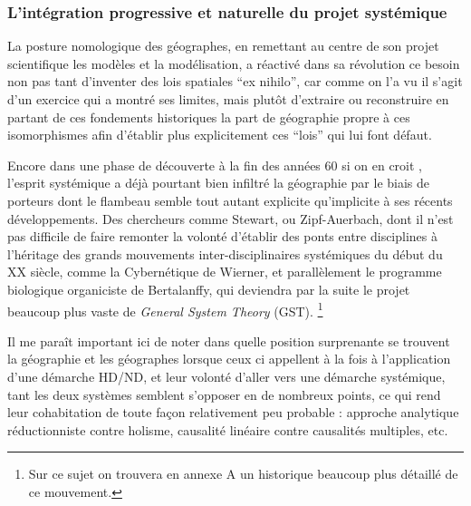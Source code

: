 
\subsubsection{L'intégration progressive et naturelle du projet systémique}
\label{sssec:progressive_systemique}

La posture nomologique des géographes, en remettant au centre de son projet scientifique les modèles et la modélisation, a réactivé dans sa révolution ce besoin non pas tant d'inventer des lois spatiales \foreignquote{latin}{ex nihilo}, car comme on l'a vu il s'agit d'un exercice qui a montré ses limites, mais plutôt d'extraire ou reconstruire en partant de ces fondements historiques la part de géographie propre à ces isomorphismes afin d'établir plus explicitement ces \enquote{lois} qui lui font défaut.

Encore dans une phase de découverte à la fin des années 60 si on en croit \textcite{Harvey1969}, l'esprit systémique \textcite{Ackerman1963} a déjà pourtant bien infiltré la géographie par le biais de porteurs dont le flambeau semble tout autant explicite qu'implicite à ses récents développements. Des chercheurs comme Stewart, ou Zipf-Auerbach, dont il n'est pas difficile de faire remonter la volonté d'établir des ponts entre disciplines à l'héritage des grands mouvements inter-disciplinaires systémiques du début du XX siècle, comme la Cybernétique de Wierner, et parallèlement le programme biologique organiciste de Bertalanffy, qui deviendra par la suite le projet beaucoup plus vaste de \textit{General System Theory} (GST). \footnote{Sur ce sujet on trouvera en annexe A un historique beaucoup plus détaillé de ce mouvement.}

Il me paraît important ici de noter dans quelle position surprenante se trouvent la géographie et les géographes lorsque ceux ci appellent à la fois à l'application d'une démarche HD/ND, et leur volonté d'aller vers une démarche systémique, tant les deux systèmes semblent s'opposer en de nombreux points, ce qui rend leur cohabitation de toute façon relativement peu probable : approche analytique réductionniste contre holisme, causalité linéaire contre causalités multiples, etc.

